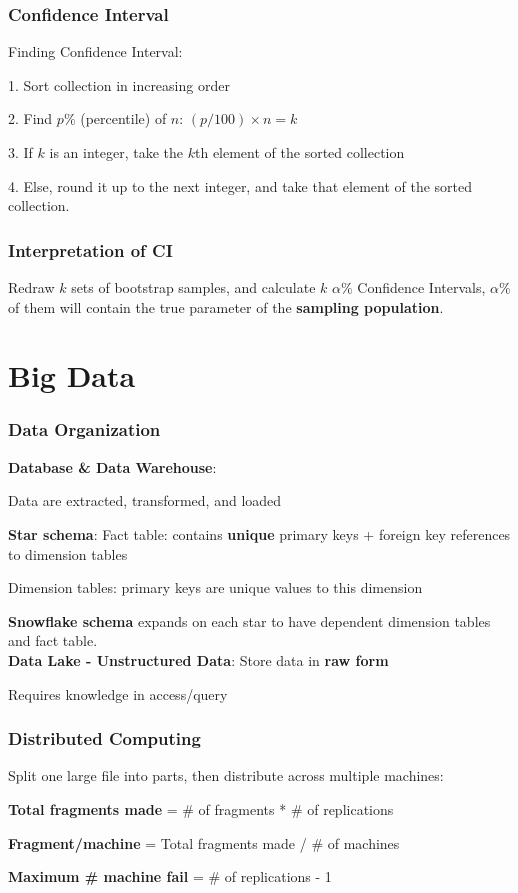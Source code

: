 \documentclass[8pt]{extarticle}
\begin{document}
\subsubsection*{Confidence Interval}
Finding Confidence Interval: \par
1. Sort collection in increasing order \par
2. Find $p\%$ (percentile) of $n$: $(p/ 100) \times n = k$ \par
3. If $k$ is an integer, take the $k$th element of the sorted collection \par
4. Else, round it up to the next integer, and take that element of the sorted collection. \\

\subsubsection*{Interpretation of CI}
Redraw $k$ sets of bootstrap samples, and calculate $k$ $\alpha \%$ Confidence Intervals, $\alpha \%$ of them will contain the true parameter of the \textbf{sampling population}. \\
\hline

\section*{Big Data}
\subsubsection*{Data Organization}
\textbf{Database & Data Warehouse}:\par
Data are extracted, transformed, and loaded \par

\textbf{Star schema}:
Fact table: contains \textbf{unique} primary keys + foreign key references to dimension tables\par
Dimension tables: primary keys are unique values to this dimension\par
\textbf{Snowflake schema} expands on each star to have dependent dimension tables and fact table. \\

\textbf{Data Lake - Unstructured Data}:
Store data in \textbf{raw form}\par
Requires knowledge in access/query \\

\subsubsection*{Distributed Computing}
Split one large file into parts, then distribute across multiple machines: \par
\textbf{Total fragments made} = \# of fragments * \# of replications \par
\textbf{Fragment/machine} = Total fragments made / \# of machines \par
\textbf{Maximum \# machine fail} = \# of replications - 1 \\
\end{document}
